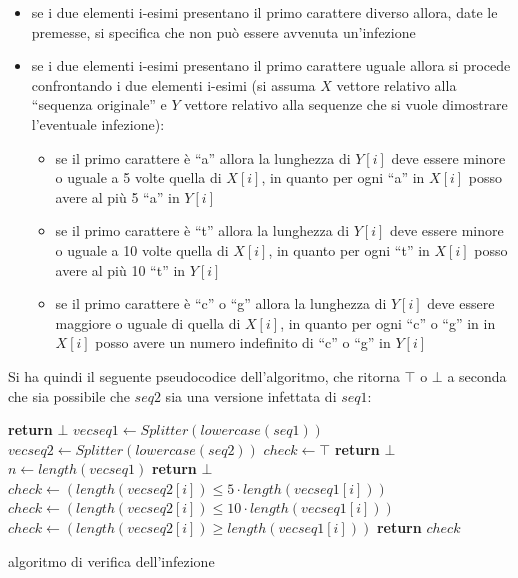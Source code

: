 \documentclass[a4paper,12pt, oneside]{book}
\begin{document}
\begin{itemize}
  \item se i due elementi i-esimi presentano il primo carattere diverso allora,
  date le premesse, si specifica che non può essere avvenuta un'infezione
  \item se i due elementi i-esimi presentano il primo carattere uguale allora si
  procede confrontando i due elementi i-esimi (si assuma $X$ vettore relativo
  alla ``sequenza originale'' e $Y$ vettore relativo alla sequenze che si vuole
  dimostrare l'eventuale infezione):
  \begin{itemize}
    \item se il primo carattere è ``a'' allora la lunghezza di $Y[i]$ deve
    essere minore o uguale a 5 volte quella di $X[i]$, in quanto per ogni ``a''
    in $X[i]$ posso avere al più 5 ``a'' in $Y[i]$
    \item se il primo carattere è ``t'' allora la lunghezza di $Y[i]$ deve
    essere minore o uguale a 10 volte quella di $X[i]$, in quanto per ogni ``t''
    in $X[i]$ posso avere al più 10 ``t'' in $Y[i]$
    \item se il primo carattere è ``c'' o ``g'' allora la lunghezza di $Y[i]$
    deve essere maggiore o uguale di quella di $X[i]$, in quanto per ogni ``c''
    o ``g'' in  in $X[i]$ posso avere un numero indefinito di ``c'' o ``g'' in
    $Y[i]$ 
  \end{itemize}
\end{itemize}
Si ha quindi il seguente pseudocodice dell'algoritmo, che ritorna $\top$ o
$\bot$ a seconda che sia possibile che $seq2$ sia una versione infettata di
$seq1$:
\begin{algorithm}[H]
  \begin{algorithmic}[1]
    \State \textbf{return} $\bot$
    \EndIf
    \State $vecseq1\gets Splitter(lowercase(seq1))$
    \State $vecseq2\gets Splitter(lowercase(seq2))$
    \State $check \gets \top$
    \State \textbf{return} $\bot$
    \EndIf
    \State $n \gets length(vecseq1)$
    \State \textbf{return} $\bot$
    \EndIf
    \State $check \gets (length(vecseq2[i]) \leq 5\cdot length(vecseq1[i]))$
    \State $check \gets (length(vecseq2[i]) \leq 10\cdot length(vecseq1[i]))$
    \Else
    \State $check \gets (length(vecseq2[i]) \geq length(vecseq1[i]))$
    \EndIf
    \EndFor
    \State \textbf{return} $check$
    \EndFunction
  \end{algorithmic}
  \caption{algoritmo di verifica dell'infezione}
\end{algorithm}
\end{document}

